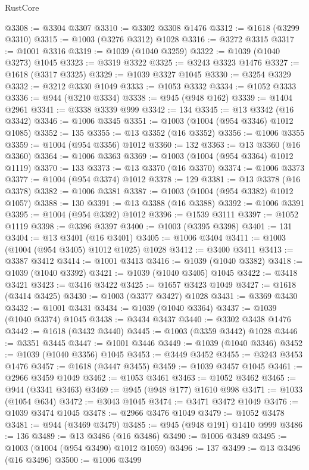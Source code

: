 \begin{lexlean}{RustCore}
\begin{coremodule}
@3308 := @3304 @3307
@3310 := @3302 @3308 @1476
@3312 := @1618 (@3299 @3310)
@3315 := @1003 (@3276 @3312) @1028
@3316 := @3272 @3315
@3317 := @1001 @3316
@3319 := @1039 (@1040 @3259)
@3322 := @1039 (@1040 @3273) @1045
@3323 := @3319 @3322
@3325 := @3243 @3323 @1476
@3327 := @1618 (@3317 @3325)
@3329 := @1039 @3327 @1045
@3330 := @3254 @3329
@3332 := @3212 @3330 @1049
@3333 := @1053 @3332
@3334 := @1052 @3333
@3336 := @944 (@3210 @3334)
@3338 := @945 (@948 @162)
@3339 := @1404 @2961
@3341 := @3338 @3339 @999
@3342 := 134
@3345 := @13 @3342 (@16 @3342)
@3346 := @1006 @3345
@3351 := @1003 (@1004 (@954 @3346) @1012 @1085)
@3352 := 135
@3355 := @13 @3352 (@16 @3352)
@3356 := @1006 @3355
@3359 := @1004 (@954 @3356) @1012
@3360 := 132
@3363 := @13 @3360 (@16 @3360)
@3364 := @1006 @3363
@3369 := @1003 (@1004 (@954 @3364) @1012 @1119)
@3370 := 133
@3373 := @13 @3370 (@16 @3370)
@3374 := @1006 @3373
@3377 := @1004 (@954 @3374) @1012
@3378 := 129
@3381 := @13 @3378 (@16 @3378)
@3382 := @1006 @3381
@3387 := @1003 (@1004 (@954 @3382) @1012 @1057)
@3388 := 130
@3391 := @13 @3388 (@16 @3388)
@3392 := @1006 @3391
@3395 := @1004 (@954 @3392) @1012
@3396 := @1539 @3111
@3397 := @1052 @1119
@3398 := @3396 @3397
@3400 := @1003 (@3395 @3398)
@3401 := 131
@3404 := @13 @3401 (@16 @3401)
@3405 := @1006 @3404
@3411 := @1003 (@1004 (@954 @3405) @1012 @1025) @1028
@3412 := @3400 @3411
@3413 := @3387 @3412
@3414 := @1001 @3413
@3416 := @1039 (@1040 @3382)
@3418 := @1039 (@1040 @3392)
@3421 := @1039 (@1040 @3405) @1045
@3422 := @3418 @3421
@3423 := @3416 @3422
@3425 := @1657 @3423 @1049
@3427 := @1618 (@3414 @3425)
@3430 := @1003 (@3377 @3427) @1028
@3431 := @3369 @3430
@3432 := @1001 @3431
@3434 := @1039 (@1040 @3364)
@3437 := @1039 (@1040 @3374) @1045
@3438 := @3434 @3437
@3440 := @3302 @3438 @1476
@3442 := @1618 (@3432 @3440)
@3445 := @1003 (@3359 @3442) @1028
@3446 := @3351 @3445
@3447 := @1001 @3446
@3449 := @1039 (@1040 @3346)
@3452 := @1039 (@1040 @3356) @1045
@3453 := @3449 @3452
@3455 := @3243 @3453 @1476
@3457 := @1618 (@3447 @3455)
@3459 := @1039 @3457 @1045
@3461 := @2966 @3459 @1049
@3462 := @1053 @3461
@3463 := @1052 @3462
@3465 := @944 (@3341 @3463)
@3469 := @945 (@948 @177) @1610 @998
@3471 := @1033 (@1054 @634)
@3472 := @3043 @1045
@3474 := @3471 @3472 @1049
@3476 := @1039 @3474 @1045
@3478 := @2966 @3476 @1049
@3479 := @1052 @3478
@3481 := @944 (@3469 @3479)
@3485 := @945 (@948 @191) @1410 @999
@3486 := 136
@3489 := @13 @3486 (@16 @3486)
@3490 := @1006 @3489
@3495 := @1003 (@1004 (@954 @3490) @1012 @1059)
@3496 := 137
@3499 := @13 @3496 (@16 @3496)
@3500 := @1006 @3499

\end{coremodule}
\end{lexlean}
